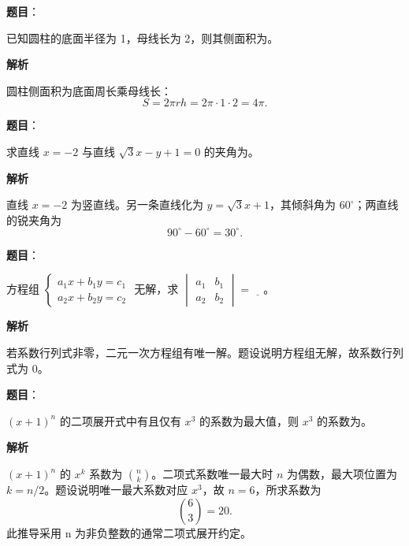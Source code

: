 \begin{answer}

\textbf{题目}：

已知圆柱的底面半径为 1，母线长为 2，则其侧面积为\gkblank{}。

\textbf{解析}

圆柱侧面积为底面周长乘母线长：
\nopagebreak[4]
\[
S=2\pi rh=2\pi\cdot1\cdot2=4\pi.
\]


\end{answer}
\begin{answer}

\textbf{题目}：

求直线 $x=-2$ 与直线 $\sqrt3x-y+1=0$ 的夹角为\gkblank{}。

\textbf{解析}

直线 $x=-2$ 为竖直线。另一条直线化为 $y=\sqrt3x+1$，其倾斜角为 $60^\circ$；两直线的锐夹角为
\nopagebreak[4]
\[
90^\circ-60^\circ=30^\circ.
\]


\end{answer}
\begin{answer}

\textbf{题目}：

方程组 $\begin{cases}a_1x+b_1y=c_1\\a_2x+b_2y=c_2\end{cases}$ 无解，求 $\begin{vmatrix}a_1&b_1\\a_2&b_2\end{vmatrix}=\underline{\quad}$。

\textbf{解析}

若系数行列式非零，二元一次方程组有唯一解。题设说明方程组无解，故系数行列式为 0。


\end{answer}
\begin{answer}

\textbf{题目}：

$(x+1)^n$ 的二项展开式中有且仅有 $x^3$ 的系数为最大值，则 $x^3$ 的系数为\gkblank{}。

\textbf{解析}

$(x+1)^n$ 的 $x^k$ 系数为 \(\binom nk\)。二项式系数唯一最大时 $n$ 为偶数，最大项位置为 $k=n/2$。题设说明唯一最大系数对应 $x^3$，故 $n=6$，所求系数为
\nopagebreak[4]
\[
\binom63=20.
\]
此推导采用 n 为非负整数的通常二项式展开约定。


\end{answer}
